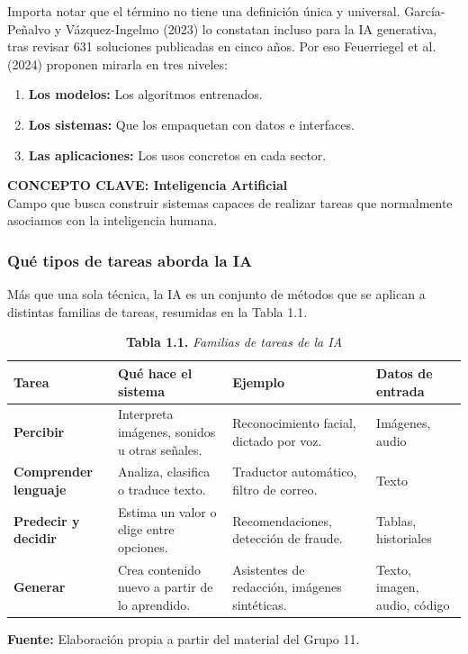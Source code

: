 Importa notar que el término no tiene una definición única y universal. García-Peñalvo y Vázquez-Ingelmo (2023) lo constatan incluso para la IA generativa, tras revisar 631 soluciones publicadas en cinco años. Por eso Feuerriegel et al. (2024) proponen mirarla en tres niveles:
\begin{enumerate}
    \item \textbf{Los modelos:} Los algoritmos entrenados.
    \item \textbf{Los sistemas:} Que los empaquetan con datos e interfaces.
    \item \textbf{Las aplicaciones:} Los usos concretos en cada sector.
\end{enumerate}

\begin{cajagris}
\textbf{CONCEPTO CLAVE: Inteligencia Artificial}\\
Campo que busca construir sistemas capaces de realizar tareas que normalmente asociamos con la inteligencia humana.
\end{cajagris}

\subsubsection{Qué tipos de tareas aborda la IA}
Más que una sola técnica, la IA es un conjunto de métodos que se aplican a distintas familias de tareas, resumidas en la Tabla 1.1.

\begin{table}[htpb!]
\centering
\small\sffamily
\caption{\textbf{Tabla 1.1.} \textit{Familias de tareas de la IA}}
\vspace{0.15cm}
\begin{tabularx}{\textwidth}{>{\bfseries}p{3.2cm} >{\raggedright\arraybackslash}p{4.2cm} >{\raggedright\arraybackslash}p{4.2cm} >{\raggedright\arraybackslash}X}
\toprule
Tarea & Qué hace el sistema & Ejemplo & Datos de entrada \\
\midrule
Percibir & Interpreta imágenes, sonidos u otras señales. & Reconocimiento facial, dictado por voz. & Imágenes, audio \\
\midrule
Comprender lenguaje & Analiza, clasifica o traduce texto. & Traductor automático, filtro de correo. & Texto \\
\midrule
Predecir y decidir & Estima un valor o elige entre opciones. & Recomendaciones, detección de fraude. & Tablas, historiales \\
\midrule
Generar & Crea contenido nuevo a partir de lo aprendido. & Asistentes de redacción, imágenes sintéticas. & Texto, imagen, audio, código \\
\bottomrule
\end{tabularx}
\vspace{0.15cm}
\raggedright\scriptsize \textbf{Fuente:} Elaboración propia a partir del material del Grupo 11.
\end{table}

